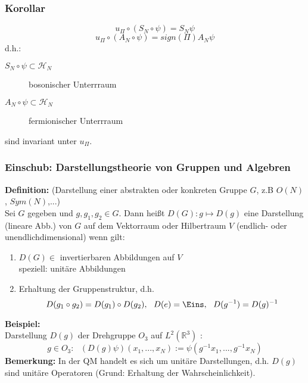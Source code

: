 \documentclass[twoside,a4paper]{scrartcl}
\renewcommand{\1}{\mathds{1}}
\begin{document}
\subsubsection*{Korollar}
$$u_\Pi \circ (S_N \circ \psi)=S_N \psi$$
$$u_\Pi \circ (A_N \circ \psi)=sign(\Pi)A_N \psi$$
d.h.:
\begin{description}
 \item[$S_N \circ \psi\subset \mathcal H_N$] bosonischer Unterrraum
 \item[$A_N \circ \psi \subset \mathcal H_N$] fermionischer Unterrraum
 \end{description}
sind invariant unter $u_\Pi$.



\subsubsection*{Einschub: Darstellungstheorie von Gruppen und Algebren}
\textbf{Definition:} (Darstellung einer abstrakten oder konkreten Gruppe $G$, z.B $O(N)$, $Sym(N)$,...)\\
Sei $G$ gegeben und $g,g_1,g_2 \in G$. Dann heißt $D(G): g \mapsto D(g)$ eine Darstellung (lineare Abb.) von $G$ auf dem Vektorraum oder Hilbertraum $V$ (endlich- oder unendlichdimensional) wenn gilt:
\begin{enumerate}
 \item $D(G) \in$ invertierbaren Abbildungen auf $V$\\
speziell: unitäre Abbildungen
 \item Erhaltung der Gruppenstruktur, d.h. $$D(g_1 \circ g_2)=D(g_1) \circ D(g_2), \ \ D(e)=\Eins, \ \ D(g^{-1})=D(g)^{-1}$$
\end{enumerate}
\textbf{Beispiel:}\\
Darstellung $D(g)$ der Drehgruppe $O_3$ auf $L^2(\mathbb R^3)$ :
$$g \in O_3: \ \ \ (D(g)\psi)(x_1,...,x_N):=\psi(g^{-1}x_1,...,g^{-1}x_N)$$
\textbf{Bemerkung:}
In der QM handelt es sich um unitäre Darstellungen, d.h. $D(g)$ sind unitäre Operatoren (Grund: Erhaltung der Wahrscheinlichkeit).
\end{document}
